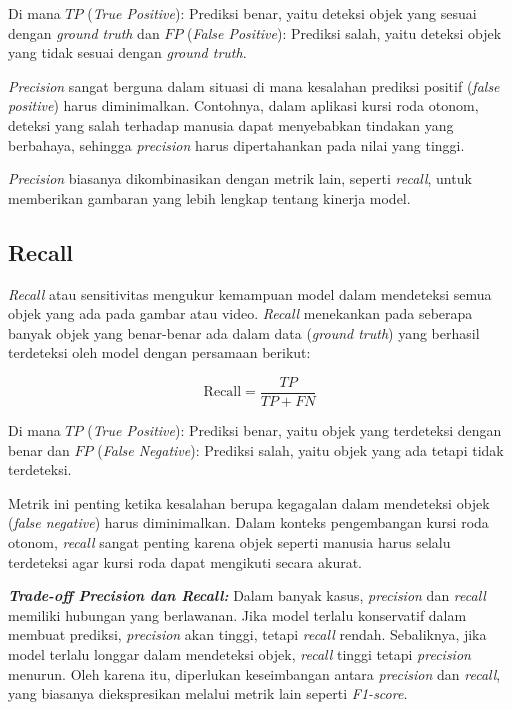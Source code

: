 Di mana \(TP\) (\emph{True Positive}): Prediksi benar, yaitu deteksi objek yang sesuai dengan \emph{ground truth} dan \(FP\) (\emph{False Positive}): Prediksi salah, yaitu deteksi objek yang tidak sesuai dengan \emph{ground truth}.

\emph{Precision} sangat berguna dalam situasi di mana kesalahan prediksi positif (\emph{false positive}) harus diminimalkan. Contohnya, dalam aplikasi kursi roda otonom, deteksi yang salah terhadap manusia dapat menyebabkan tindakan yang berbahaya, sehingga \emph{precision} harus dipertahankan pada nilai yang tinggi.

\emph{Precision} biasanya dikombinasikan dengan metrik lain, seperti \emph{recall}, untuk memberikan gambaran yang lebih lengkap tentang kinerja model.

\subsection{Recall}
\label{subsec:recall}

\emph{Recall} atau sensitivitas mengukur kemampuan model dalam mendeteksi semua objek yang ada pada gambar atau video. \emph{Recall} menekankan pada seberapa banyak objek yang benar-benar ada dalam data (\emph{ground truth}) yang berhasil terdeteksi oleh model dengan persamaan berikut:

\begin{equation} 
  \mathrm{Recall} = \frac{TP}{TP + FN} 
\end{equation}

Di mana \(TP\) (\emph{True Positive}): Prediksi benar, yaitu objek yang terdeteksi dengan benar dan \(FP\) (\emph{False Negative}): Prediksi salah, yaitu objek yang ada tetapi tidak terdeteksi.

Metrik ini penting ketika kesalahan berupa kegagalan dalam mendeteksi objek (\emph{false negative}) harus diminimalkan. Dalam konteks pengembangan kursi roda otonom, \emph{recall} sangat penting karena objek seperti manusia harus selalu terdeteksi agar kursi roda dapat mengikuti secara akurat.

\textbf{\emph{Trade-off Precision dan Recall:}} Dalam banyak kasus, \emph{precision} dan \emph{recall} memiliki hubungan yang berlawanan. Jika model terlalu konservatif dalam membuat prediksi, \emph{precision} akan tinggi, tetapi \emph{recall} rendah. Sebaliknya, jika model terlalu longgar dalam mendeteksi objek, \emph{recall} tinggi tetapi \emph{precision} menurun. Oleh karena itu, diperlukan keseimbangan antara \emph{precision} dan \emph{recall}, yang biasanya diekspresikan melalui metrik lain seperti \emph{F1-score}.

